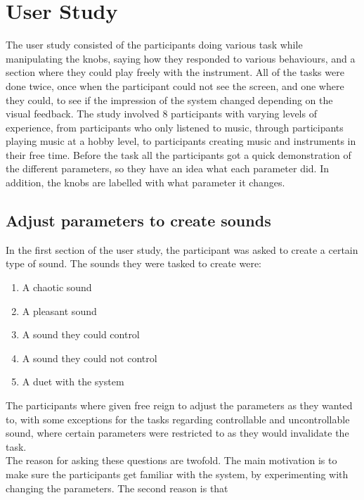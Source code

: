 \documentclass[a4paper,english]{report}
\begin{document}
	\section{User Study}
	The user study consisted of the participants doing various task while manipulating the knobs, saying how they responded to various behaviours, and a section where they could play freely with the instrument. All of the tasks were done twice, once when the participant could not see the screen, and one where they could, to see if the impression of the system changed depending on the visual feedback. The study involved 8 participants with varying levels of experience, from participants who only listened to music, through participants playing music at a hobby level, to participants creating music and instruments in their free time. Before the task all the participants got a quick demonstration of the different parameters, so they have an idea what each parameter did. In addition, the knobs are labelled with what parameter it changes.
	
	\subsection{Adjust parameters to create sounds}
	In the first section of the user study, the participant was asked to create a certain type of sound. The sounds they were tasked to create were:
	\begin{samepage}\begin{enumerate}
		\item A chaotic sound
		\item A pleasant sound
		\item A sound they could control
		\item A sound they could not control
		\item A duet with the system
	\end{enumerate}\end{samepage}
	The participants where given free reign to adjust the parameters as they wanted to, with some exceptions for the tasks regarding controllable and uncontrollable sound, where certain parameters were restricted to as they would invalidate the task.\\
	The reason for asking these questions are twofold. The main motivation is to make sure the participants get familiar with the system, by experimenting with changing the parameters. The second reason is that
\end{document}
